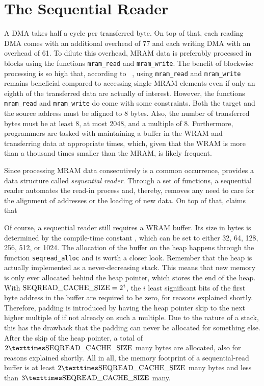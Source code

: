 \section{The Sequential Reader}
\label{sec:mram:seq_reader}

A \ac{DMA} takes half a cycle per transferred byte.
On top of that, each reading \ac{DMA} comes with an additional overhead of  \qty{77}{\cycles} and each writing \ac{DMA} with an overhead of \qty{61}{\cycles}.
To dilute this overhead, \ac{MRAM} data is preferably processed in blocks using the functions \lstinline|mram_read| and \lstinline|mram_write|.
The benefit of blockwise processing is so high that, according to \citeauthor{mutlu2022Benchmarking}~\cite[11]{mutlu2022Benchmarking}, using \lstinline|mram_read| and \lstinline|mram_write| remains beneficial compared to accessing single \ac{MRAM} elements even if only an eighth of the transferred data are actually of interest.
However, the functions \lstinline|mram_read| and \lstinline|mram_write| do come with some constraints.
Both the target and the source address must be aligned to 8 bytes.
Also, the number of transferred bytes must be at least 8, at most 2048, and a multiple of 8.
Furthermore, programmers are tasked with maintaining a buffer in the \ac{WRAM} and transferring data at appropriate times, which, given that the \ac{WRAM} is more than a thousand times smaller than the \ac{MRAM}, is likely frequent.

Since processing \ac{MRAM} data consecutively is a common occurrence, \upmem{} provides a data structure called \emph{sequential reader}.
Through a set of \langC{} functions, a sequential reader automates the read-in process and, thereby, removes any need to care for the alignment of addresses or the loading of new data.
On top of that, \upmem{} claims that ~\cite[Memory management -- Sequential readers]{upmemSDK}

Of course, a sequential reader still requires a \ac{WRAM} buffer.
Its size in bytes is determined by the compile-time constant \seqreadcachesize{}, which can be set to either 32, 64, 128, 256, 512, or 1024.
The allocation of the buffer on the heap happens through the function \lstinline|seqread_alloc| and is worth a closer look.
Remember that the heap is actually implemented as a never-decreasing stack.
This means that new memory is only ever allocated behind the heap pointer, which stores the end of the heap.
With \(\seqreadcachesize{} = \twotoi\), the \(i\) least significant bits of the first byte address in the buffer are required to be zero, for reasons explained shortly.
Therefore, padding is introduced by having the heap pointer skip to the next higher multiple of \seqreadcachesize{} if not already on such a multiple.
Due to the nature of a stack, this has the drawback that the padding can never be allocated for something else.
After the skip of the heap pointer, a total of \(2 × \seqreadcachesize{}\) many bytes are allocated, also for reasons explained shortly.
All in all, the memory footprint of a sequential-read buffer is at least \(2 × \seqreadcachesize{}\) many bytes and less than \(3 × \seqreadcachesize{}\) many.

